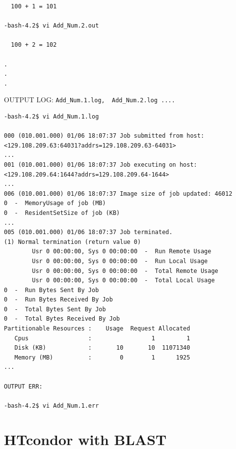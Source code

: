 \documentclass{article}
\begin{document}
\begin{enumerate}
\begin{verbatim}
  100 + 1 = 101

-bash-4.2$ vi Add_Num.2.out

  100 + 2 = 102

.
.
.
\end{verbatim}
\normalsize
OUTPUT LOG: \verb+Add_Num.1.log,  Add_Num.2.log ....+
\scriptsize\begin{verbatim}
-bash-4.2$ vi Add_Num.1.log

000 (010.001.000) 01/06 18:07:37 Job submitted from host: <129.108.209.63:64031?addrs=129.108.209.63-64031>
...
001 (010.001.000) 01/06 18:07:37 Job executing on host: <129.108.209.64:1644?addrs=129.108.209.64-1644>
...
006 (010.001.000) 01/06 18:07:37 Image size of job updated: 46012
0  -  MemoryUsage of job (MB)
0  -  ResidentSetSize of job (KB)
...
005 (010.001.000) 01/06 18:07:37 Job terminated.
(1) Normal termination (return value 0)
        Usr 0 00:00:00, Sys 0 00:00:00  -  Run Remote Usage
        Usr 0 00:00:00, Sys 0 00:00:00  -  Run Local Usage
        Usr 0 00:00:00, Sys 0 00:00:00  -  Total Remote Usage
        Usr 0 00:00:00, Sys 0 00:00:00  -  Total Local Usage
0  -  Run Bytes Sent By Job
0  -  Run Bytes Received By Job
0  -  Total Bytes Sent By Job
0  -  Total Bytes Received By Job
Partitionable Resources :    Usage  Request Allocated
   Cpus                 :                 1         1
   Disk (KB)            :       10       10  11071340
   Memory (MB)          :        0        1      1925
...

OUTPUT ERR:

-bash-4.2$ vi Add_Num.1.err
\end{verbatim}
\normalsize
\end{enumerate}

\section{HTcondor with BLAST}
\end{document}
